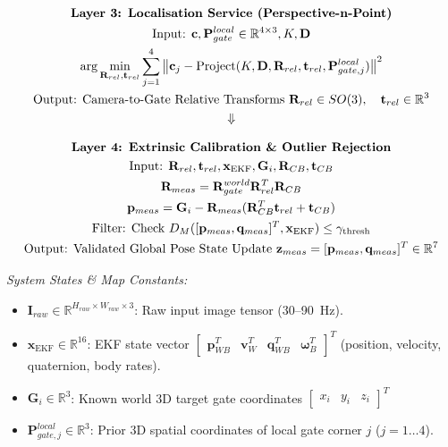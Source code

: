 \documentclass{article}
\begin{document}
\begin{tcolorbox}[colback=gray!5, colframe=black, arc=2mm, title=\textbf{Vision Pipeline Thread ($T_1$) Architecture Stack}, center title]
$$
\begin{gathered}
    \text{\textbf{Layer 3: Localisation Service (Perspective-n-Point)}} \\
    \text{Input: } \mathbf{c}, \mathbf{P}_{gate}^{local} \in \mathbb{R}^{4 \times 3}, K, \mathbf{D} \\
    \arg\min_{\mathbf{R}_{rel}, \mathbf{t}_{rel}} \sum_{j=1}^{4} \left\| \mathbf{c}_j - \text{Project}(K, \mathbf{D}, \mathbf{R}_{rel}, \mathbf{t}_{rel}, \mathbf{P}_{gate, j}^{local}) \right\|^2 \\
    \text{Output: Camera-to-Gate Relative Transforms } \mathbf{R}_{rel} \in SO(3), \quad \mathbf{t}_{rel} \in \mathbb{R}^3 \\
    \Downarrow
\end{gathered}
$$

$$
\begin{gathered}
    \text{\textbf{Layer 4: Extrinsic Calibration \& Outlier Rejection}} \\
    \text{Input: } \mathbf{R}_{rel}, \mathbf{t}_{rel}, \mathbf{x}_{\text{EKF}}, \mathbf{G}_i, \mathbf{R}_{CB}, \mathbf{t}_{CB} \\
    \mathbf{R}_{meas} = \mathbf{R}_{gate}^{world} \mathbf{R}_{rel}^T \mathbf{R}_{CB} \\
    \mathbf{p}_{meas} = \mathbf{G}_i - \mathbf{R}_{meas} (\mathbf{R}_{CB}^T \mathbf{t}_{rel} + \mathbf{t}_{CB}) \\
    \text{Filter: Check } D_M([\mathbf{p}_{meas}, \mathbf{q}_{meas}]^T, \mathbf{x}_{\text{EKF}}) \le \gamma_{\text{thresh}} \\
    \text{Output: Validated Global Pose State Update } \mathbf{z}_{meas} = [\mathbf{p}_{meas}, \mathbf{q}_{meas}]^T \in \mathbb{R}^7
\end{gathered}
$$
\end{tcolorbox}

\small
\noindent\textit{System States \& Map Constants:}
\begin{itemize}
    \item $\mathbf{I}_{raw} \in \mathbb{R}^{H_{raw} \times W_{raw} \times 3}$: Raw input image tensor (30--90~Hz).
    \item $\mathbf{x}_{\text{EKF}} \in \mathbb{R}^{16}$: EKF state vector $\begin{bmatrix} \mathbf{p}_{WB}^T & \mathbf{v}_W^T & \mathbf{q}_{WB}^T & \mathbf{\omega}_B^T \end{bmatrix}^T$ (position, velocity, quaternion, body rates).
    \item $\mathbf{G}_i \in \mathbb{R}^3$: Known world 3D target gate coordinates $\begin{bmatrix} x_i & y_i & z_i \end{bmatrix}^T$
    \item $\mathbf{P}_{gate, j}^{local} \in \mathbb{R}^3$: Prior 3D spatial coordinates of local gate corner $j$ ($j = 1 \dots 4$).
\end{itemize}
\end{document}

